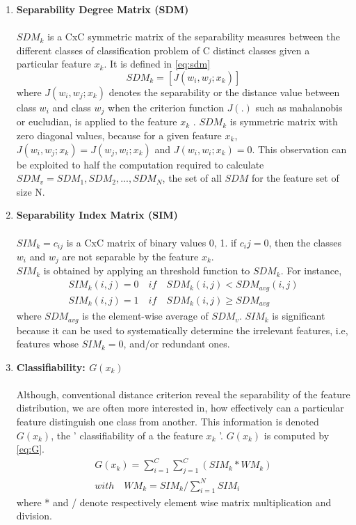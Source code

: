 \begin{enumerate}
	\item \textbf{Separability Degree Matrix (SDM)}\\\\
	\(SDM_k\) is a CxC symmetric matrix of the separability measures between the different classes of classification problem of C distinct classes given a particular feature \(x_k\).
	It is defined in \ref{eq:sdm}
\subitem \[SDM_k = [J(w_i, w_j; {x_k})] \label{eq:sdm}\]	
\subitem where \(J(w_i, w_j; {x_k})\) denotes the separability or the distance value between class \(w_i\)  and class \(w_j\) when the criterion function \(J(\textbf{.})\) such as mahalanobis \cite{maha2013} or eucludian, is applied to the feature \(x_k\) \cite{sima2013}. 
	\(SDM_k\) is symmetric matrix with zero diagonal values, because for a given feature \(x_k\), \(J(w_i, w_j; {x_k}) = J(w_j, w_i; {x_k})\) and \(J(w_i, w_i; {x_k}) = 0\).
	This observation can be exploited  to half the computation required to calculate \(SDM_v = {SDM_1, SDM_2, ..., SDM_N}\), the set of  all \(SDM\) for the feature set of size N.
	 
	\item \textbf{Separability Index Matrix (SIM)}\\\\
	\(SIM_k = {c_{ij}}\) is a CxC matrix of binary values {0, 1}. if \(c_ij=0\), then the classes \(w_i\) and \(w_j\) are not separable by the feature \(x_k\).\\
	\(SIM_k\) is obtained by applying an threshold function to \(SDM_k\).
	For instance, 
	\begin{align*}
		SIM_k(i, j) = 0 \quad if  \quad SDM_k(i, j) < SDM_{avg}(i, j)\\
		SIM_k(i,j) = 1 \quad if  \quad SDM_k(i,j) \geq SDM_{avg}
	\end{align*}
	where \(SDM_{avg}\) is the element-wise average of \(SDM_v\).
	\(SIM_k\) is significant because it can be used to systematically determine the irrelevant features, i.e, features whose \(SIM_k = 0\), and/or redundant ones. \cite{sima2013}
	
	
	\item \textbf{Classifiability: \(G(x_k)\)} \label{con:class}\\\\
	Although, conventional distance criterion reveal the separability of the feature distribution, \cite{sima2013}
	 we are often more interested in, how effectively can a particular feature distinguish one class from another. This information is denoted \(G(x_k)\), the ' classifiability of a the feature \(x_k\) '.
	 \(G(x_k)\) is computed by \ref{eq:G}.
	 \begin{align}
	 	G(x_k) = \sum_{i = 1}^{C}\sum_{j = 1}^{C}(SIM_k*WM_k) \label{eq:G}
	 	\\ with \quad WM_k = SIM_k / \sum_{i=1}^{N}SIM_i
	 \end{align}
	 where * and / denote respectively element wise matrix multiplication and division.
\end{enumerate}

